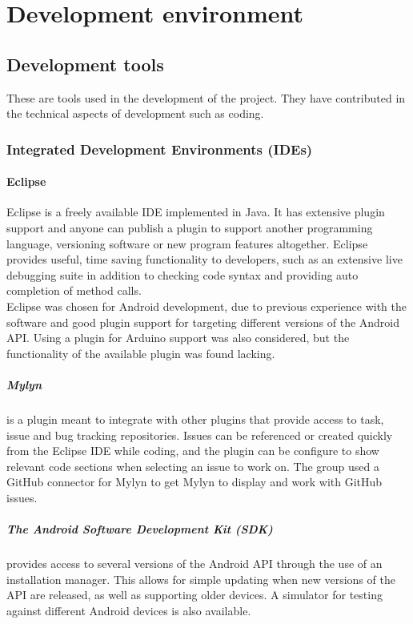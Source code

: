 \chapter{Development environment}
\section{Development tools}
These are tools used in the development of the project. They have contributed in the technical aspects of development such as coding.
\subsection{Integrated Development Environments (IDEs)}
\subsubsection{Eclipse}
Eclipse is a freely available IDE implemented in Java. It has extensive plugin support and anyone can publish a plugin to support another programming language, versioning software or new program features altogether. Eclipse provides useful, time saving functionality to developers, such as an extensive live debugging suite in addition to checking code syntax and providing auto completion of method calls.\\
Eclipse was chosen for Android development, due to previous experience with the software and good plugin support for targeting different versions of the Android API. Using a plugin for Arduino support was also considered, but the functionality of the available plugin was found lacking. %

\paragraph{Mylyn}
is a plugin meant to integrate with other plugins that provide access to task, issue and bug tracking repositories. Issues can be referenced or created quickly from the Eclipse IDE while coding, and the plugin can be configure to show relevant code sections when selecting an issue to work on. The group used a GitHub connector for Mylyn to get Mylyn to display and work with GitHub issues.

\paragraph{The Android Software Development Kit (SDK)}
provides access to several versions of the Android API through the use of an installation manager. This allows for simple updating when new versions of the API are released, as well as supporting older devices. A simulator for testing against different Android devices is also available.


